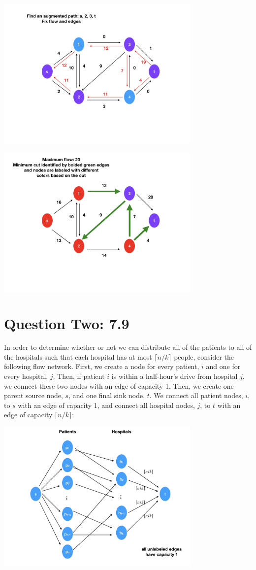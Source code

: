 \documentclass[11pt,letterpaper]{article}
\begin{document}
\includegraphics[width=10cm]{Graph4.jpeg}

\includegraphics[width=10cm]{Graph5.jpeg}

\section*{Question Two: 7.9}
In order to determine whether or not we can distribute all of the patients to all of the hospitals such that each hospital has at most $\lceil n/k \rceil$ people, consider the following flow network. First, we create a node for every patient, $i$ and one for every hospital, $j$. Then, if patient $i$ is within a half-hour's drive from hospital $j$, we connect these two nodes with an edge of capacity 1. Then, we create one parent source node, $s$, and one final sink node, $t$. We connect all patient nodes, $i$, to $s$ with an edge of capacity 1, and connect all hospital nodes, $j$, to $t$ with an edge of capacity $\lceil n/k \rceil$:

\includegraphics[width=10cm]{question79.jpeg}
\end{document}
